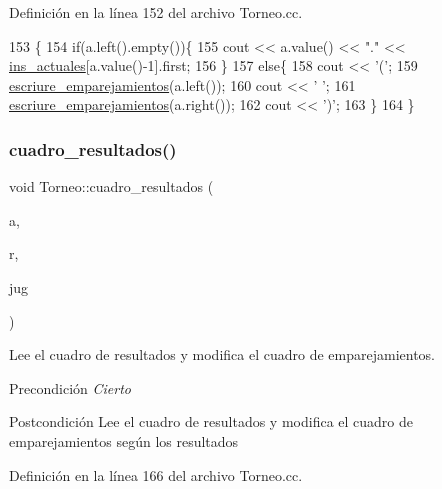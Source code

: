 Definición en la línea 152 del archivo Torneo.\+cc.


\begin{DoxyCode}
153 \{
154     \textcolor{keywordflow}{if}(a.left().empty())\{
155       cout << a.value() << \textcolor{stringliteral}{"."} << \hyperlink{class_torneo_a2293acd2d9d04bdefc603ab4cdce2c5a}{ins\_actuales}[a.value()-1].first;
156     \}
157     \textcolor{keywordflow}{else}\{
158       cout << \textcolor{charliteral}{'('};
159       \hyperlink{class_torneo_ada7981ac531bf186fa6df689620574cc}{escriure\_emparejamientos}(a.left());
160       cout << \textcolor{charliteral}{' '};
161       \hyperlink{class_torneo_ada7981ac531bf186fa6df689620574cc}{escriure\_emparejamientos}(a.right());
162       cout << \textcolor{charliteral}{')'};
163     \}
164 \}
\end{DoxyCode}
\mbox{\label{class_torneo_a64eda02f7720674f1808521d5547c02a}} 
\subsubsection{\texorpdfstring{cuadro\+\_\+resultados()}{cuadro\_resultados()}}
{\footnotesize\ttfamily void Torneo\+::cuadro\+\_\+resultados (\begin{DoxyParamCaption}\item[{Bin\+Tree$<$ int $>$ \&}]{a,  }\item[{Bin\+Tree$<$ string $>$ \&}]{r,  }\item[{\hyperlink{class_cjt__jugadores}{Cjt\+\_\+jugadores} \&}]{jug }\end{DoxyParamCaption})\hspace{0.3cm}{\ttfamily [private]}}



Lee el cuadro de resultados y modifica el cuadro de emparejamientos. 

\begin{DoxyPrecond}{Precondición}
{\itshape Cierto} 
\end{DoxyPrecond}
\begin{DoxyPostcond}{Postcondición}
Lee el cuadro de resultados y modifica el cuadro de emparejamientos según los resultados 
\end{DoxyPostcond}


Definición en la línea 166 del archivo Torneo.\+cc.


